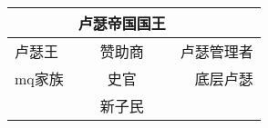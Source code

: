 \begin{center}
    \begin{tabular}{|l|c|r|}
        \hline
             & \textbf{卢瑟帝国国王} &       \\
        \hline
        卢瑟王  & 赞助商             & 卢瑟管理者 \\
        \hline
        mq家族 & 史官              & 底层卢瑟  \\
        \hline
             & 新子民             &       \\
        \hline
    \end{tabular}
\end{center}